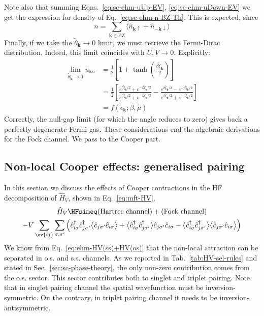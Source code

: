 %
Note also that summing Eqns.~\eqref{eq:sc-ehm-uUp-EV}, \eqref{eq:sc-ehm-uDown-EV} we get the expression for density of Eq.~\eqref{eq:sc-ehm-n-BZ-Th}. This is expected, since
\[
	n = \sum_{\mathbf{k}\in\mathrm{BZ}} \langle \hat n_{\mathbf{k}\uparrow} + \hat n_{-\mathbf{k}\downarrow} \rangle
\]	
Finally, if we take the $\tilde{\theta}_\mathbf{k} \to 0$ limit, we must retrieve the Fermi-Dirac distribution. Indeed, this limit coincides with $U,V \to 0$. Explicitly:
\[
\begin{aligned}
	\lim_{\tilde{\theta}_\mathbf{k} \to 0} u_{\mathbf{k}\sigma} &= \frac{1}{2} \left[
		1 + \tanh(\frac{\beta \tilde{\xi}_\mathbf{k}}{2})
	\right] \\ 
	&= \frac{1}{2} \left[
		\frac{
			e^{\beta \tilde{\xi}_\mathbf{k}/2} + e^{-\beta \tilde{\xi}_\mathbf{k}/2}
		}{
			e^{\beta \tilde{\xi}_\mathbf{k}/2} + e^{-\beta \tilde{\xi}_\mathbf{k}/2}
		} - \frac{
			e^{\beta \tilde{\xi}_\mathbf{k}/2} - e^{-\beta \tilde{\xi}_\mathbf{k}/2}
		}{
			e^{\beta \tilde{\xi}_\mathbf{k}/2} + e^{-\beta \tilde{\xi}_\mathbf{k}/2}
		}
	\right] \\
	&= f(\tilde{\epsilon}_\mathbf{k};\beta,\tilde{\mu})
\end{aligned}
\]
Correctly, the null-gap limit (for which the angle reduces to zero) gives back a perfectly degenerate Fermi gas. These considerations end the algebraic derivations for the Fock channel. We pass to the Cooper part.

\subsection{Non-local Cooper effects: generalised pairing}\label{subsec:sc-cooper}

In this section we discuss the effects of Cooper contractions in the HF decomposition of $\hat H_V$, shown in Eq.~\eqref{eq:mft-HV},
\begin{multline*}
	\hat H_V \HFsimeq
	(\text{Hartree channel}) + (\text{Fock channel}) \\
	-V \sum_{\ev{ij}} \sum_{\sigma,\sigma'} \Big(
	\hat c_{i\sigma}^\dagger \hat c_{j\sigma'}^\dagger \big\langle \hat c_{j\sigma'} \hat c_{i\sigma} \big\rangle + \big\langle \hat c_{i\sigma}^\dagger \hat c_{j\sigma'}^\dagger \big\rangle \hat c_{j\sigma'} \hat c_{i\sigma} - \big\langle \hat c_{i\sigma}^\dagger \hat c_{j\sigma'}^\dagger \big\rangle  \big\langle \hat c_{j\sigma'} \hat c_{i\sigma} \big\rangle \Big)
\end{multline*}
We know from Eq.~\eqref{eq:ehm-HV(ss)+HV(os)} that the non-local attraction can be separated in o.s. and s.s. channels. As we reported in Tab.~\ref{tab:HV-sel-rules} and stated in Sec.~\ref{sec:sc-phase-theory}, the only non-zero contribution comes from the o.s. sector. This sector contributes both to singlet and triplet pairing. Note that in singlet pairing channel the spatial wavefunction must be inversion-symmetric. On the contrary, in triplet pairing channel it needs to be inversion-antisymmetric. 

